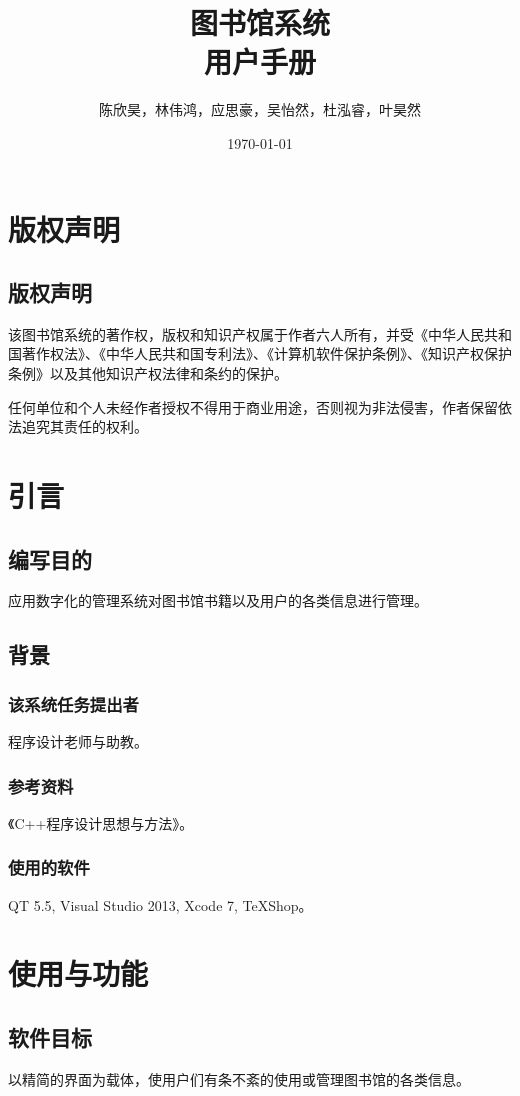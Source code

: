 \documentclass[UTF8]{ctexart}
\title{图书馆系统\\用户手册}
\author{陈欣昊，林伟鸿，应思豪，吴怡然，杜泓睿，叶昊然}
\date{\today}
\begin{document}
\maketitle
\newpage
\tableofcontents
\newpage
\section{版权声明}
\subsection{版权声明}
\par
该图书馆系统的著作权，版权和知识产权属于作者六人所有，并受《中华人民共和国著作权法》、《中华人民共和国专利法》、《计算机软件保护条例》、《知识产权保护条例》以及其他知识产权法律和条约的保护。
\par
任何单位和个人未经作者授权不得用于商业用途，否则视为非法侵害，作者保留依法追究其责任的权利。
\section{引言}
\subsection{编写目的}
\par	
应用数字化的管理系统对图书馆书籍以及用户的各类信息进行管理。
\subsection{背景}
\subsubsection{该系统任务提出者}
\par
程序设计老师与助教。
\subsubsection{参考资料}
\par
《C++程序设计思想与方法》。
\subsubsection{使用的软件}
\par
QT 5.5, Visual Studio 2013, Xcode 7, TeXShop。
\section{使用与功能}
\subsection{软件目标}
\par
以精简的界面为载体，使用户们有条不紊的使用或管理图书馆的各类信息。
\end{document}
